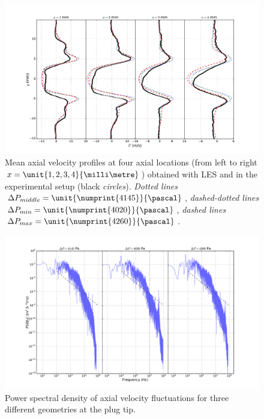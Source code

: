 \begin{figure}[!ht]
\centering
\includegraphics[width=\linewidth,keepaspectratio]{fig/applications/swirler/profile_u.pdf}
\caption{Mean axial velocity profiles at four axial locations (from left to right $x = \unit{1, 2, 3, 4}{\milli\metre}$) obtained with LES and in the experimental setup (black \emph{circles}). \emph{Dotted lines} $\Delta P_{middle} =\unit{\numprint{4145}}{\pascal} $, \emph{dashed-dotted lines}$\Delta P_{min} =\unit{\numprint{4020}}{\pascal} $, \emph{dashed lines} $\Delta P_{max} = \unit{\numprint{4260}}{\pascal}$.}
\label{fig:profile-u}
\end{figure}

\begin{figure}[!ht]
\centering
\includegraphics[width=\linewidth,keepaspectratio]{fig/applications/swirler/psd_u.pdf}
\caption{Power spectral density of axial velocity fluctuations for three different geometries at the plug tip.}
\label{fig:psd-u}
\end{figure}


